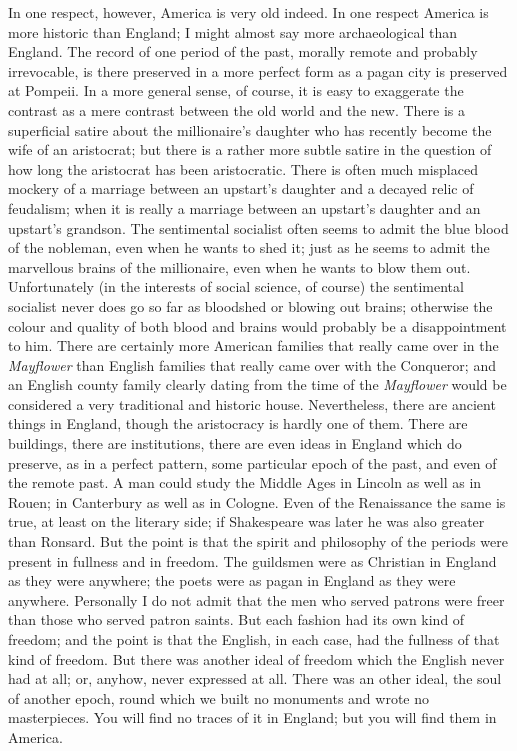 \documentclass{book}
\begin{document}
In one respect, however, America is very old indeed. In one respect America is more historic than England; I might almost say more archaeological than England. The record of one period of the past, morally remote and probably irrevocable, is there preserved in a more perfect form as a pagan city is preserved at Pompeii. In a more general sense, of course, it is easy to exaggerate the contrast as a mere contrast between the old world and the new. There is a superficial satire about the millionaire’s daughter who has recently become the wife of an aristocrat; but there is a rather more subtle satire in the question of how long the aristocrat has been aristocratic. There is often much misplaced mockery of a marriage between an upstart’s daughter and a decayed relic of feudalism; when it is really a marriage between an upstart’s daughter and an upstart’s grandson. The sentimental socialist often seems to admit the blue blood of the nobleman, even when he wants to shed it; just as he seems to admit the marvellous brains of the millionaire, even when he wants to blow them out. Unfortunately (in the interests of social science, of course) the sentimental socialist never does go so far as bloodshed or blowing out brains; otherwise the colour and quality of both blood and brains would probably be a disappointment to him. There are certainly more American families that really came over in the \emph{Mayflower} than English families that really came over with the Conqueror; and an English county family clearly dating from the time of the \emph{Mayflower} would be considered a very traditional and historic house. Nevertheless, there are ancient things in England, though the aristocracy is hardly one of them. There are buildings, there are institutions, there are even ideas in England which do preserve, as in a perfect pattern, some particular epoch of the past, and even of the remote past. A man could study the Middle Ages in Lincoln as well as in Rouen; in Canterbury as well as in Cologne. Even of the Renaissance the same is true, at least on the literary side; if Shakespeare was later he was also greater than Ronsard. But the point is that the spirit and philosophy of the periods were present in fullness and in freedom. The guildsmen were as Christian in England as they were anywhere; the poets were as pagan in England as they were anywhere. Personally I do not admit that the men who served patrons were freer than those who served patron saints. But each fashion had its own kind of freedom; and the point is that the English, in each case, had the fullness of that kind of freedom. But there was another ideal of freedom which the English never had at all; or, anyhow, never expressed at all. There was an other ideal, the soul of another epoch, round which we built no monuments and wrote no masterpieces. You will find no traces of it in England; but you will find them in America.
\end{document}
